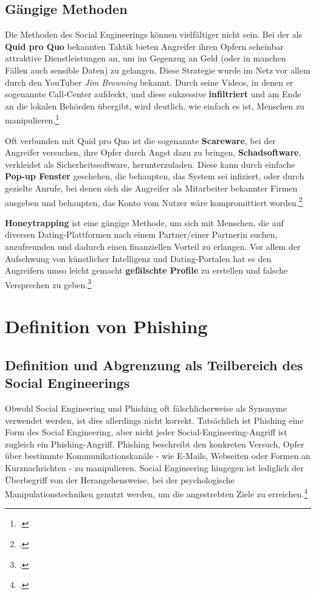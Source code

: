 \documentclass[12pt, a4paper, oneside]{scrartcl}
\begin{document}
\subsection{Gängige Methoden}
\par
Die Methoden des Social Engineerings können vielfältiger nicht sein.
Bei der als \textbf{Quid pro Quo} bekannten Taktik bieten Angreifer ihren Opfern scheinbar attraktive Dienstleistungen an, um im Gegenzug
an Geld (oder in manchen Fällen auch sensible Daten) zu gelangen. Diese Strategie wurde im Netz vor allem durch den YouTuber \textit{Jim Browning} bekannt.
Durch seine Videos, in denen er sogenannte Call-Center aufdeckt, und diese sukzessive \textbf{infiltriert} und
am Ende an die lokalen Behörden übergibt, wird deutlich, wie einfach es ist, Menschen zu manipulieren.\footcite{JB_YouTube}
\par
Oft verbunden mit Quid pro Quo ist die sogenannte \textbf{Scareware}, bei der Angreifer versuchen, ihre Opfer 
durch Angst dazu zu bringen, \textbf{Schadsoftware}, verkleidet als Sicherheitssoftware, herunterzuladen. Diese kann 
durch einfache \textbf{Pop-up Fenster} geschehen, die behaupten, das System sei infiziert, oder durch gezielte
Anrufe, bei denen sich die Angreifer als Mitarbeiter bekannter Firmen ausgeben und behaupten, das Konto
vom Nutzer wäre kompromittiert worden.\footcite{Keeper_Scareware}
\par
\textbf{Honeytrapping} ist eine gängige Methode, um sich mit Menschen, die auf diversen Dating-Plattformen nach
einem Partner/einer Partnerin suchen, anzufreunden und dadurch einen finanziellen Vorteil zu erlangen. Vor allem 
der Aufschwung von künstlicher Intelligenz und Dating-Portalen hat es den Angreifern umso leicht gemacht
\textbf{gefälschte Profile} zu erstellen und falsche Versprechen zu geben.\footcite{CS_10Arten}\\

\section{Definition von Phishing}

\subsection{Definition und Abgrenzung als Teilbereich des Social Engineerings}
Obwohl Social Engineering und Phishing oft fälschlicherweise als Synonyme verwendet werden, ist dies allerdings nicht korrekt.
Tatsächlich ist Phishing eine Form des Social Engineering, aber nicht jeder Social-Engineering-Angriff ist zugleich
ein Phishing-Angriff. 
Phishing beschreibt den konkreten Versuch, Opfer über bestimmte Kommunikationskanäle - wie E-Mails, Webseiten oder 
Formen an Kurznachrichten - zu manipulieren.
Social Engineering hingegen ist lediglich der Überbegriff von der Herangehensweise, bei der psychologische
Manipulationstechniken genutzt werden, um die angestrebten Ziele zu erreichen.\footcite{Keeper_Phishing}
\end{document}
